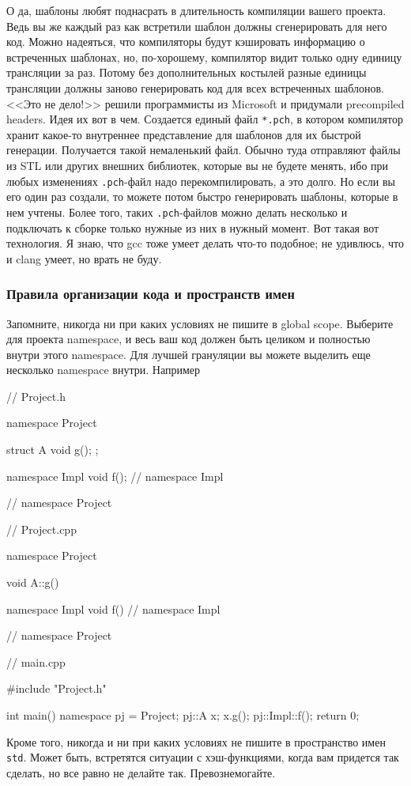 О да, шаблоны любят поднасрать в длительность компиляции вашего проекта.
Ведь вы же каждый раз как встретили шаблон должны сгенерировать для него код.
Можно надеяться, что компиляторы будут кэшировать информацию о встреченных шаблонах, но, по-хорошему, компилятор видит только одну единицу трансляции за раз.
Потому без дополнительных костылей разные единицы трансляции должны заново генерировать код для всех встреченных шаблонов.
<<Это не дело!>> решили программисты из Microsoft и придумали precompiled headers.
Идея их вот в чем.
Создается единый файл \verb"*.pch", в котором компилятор хранит какое-то внутреннее представление для шаблонов для их быстрой генерации.
Получается такой немаленький файл.
Обычно туда отправляют файлы из STL или других внешних библиотек, которые вы не будете менять, ибо при любых изменениях \verb".pch"-файл надо перекомпилировать, а это долго.
Но если вы его один раз создали, то можете потом быстро генерировать шаблоны, которые в нем учтены.
Более того, таких \verb".pch"-файлов можно делать несколько и подключать к сборке только нужные из них в нужный момент.
Вот такая вот технология.
Я знаю, что gcc тоже умеет делать что-то подобное; не удивлюсь, что и clang умеет, но врать не буду.


\subsubsection{Правила организации кода и пространств имен}

Запомните, никогда ни при каких условиях не пишите в global scope.
Выберите для проекта namespace, и весь ваш код должен быть целиком и полностью внутри этого namespace.
Для лучшей грануляции вы можете выделить еще несколько namespace внутри.
Например
\begin{cppcode}
// Project.h

namespace Project {
struct A {
  void g();
};

namespace Impl {
void f();
} // namespace Impl
} // namespace Project

// Project.cpp

namespace Project {
void A::g() {}

namespace Impl {
void f() {}
} // namespace Impl
} // namespace Project

// main.cpp

#include "Project.h"

int main() {
  namespace pj = Project;
  pj::A x;
  x.g();
  pj::Impl::f();
  return 0;
}
\end{cppcode}
Кроме того, никогда и ни при каких условиях не пишите в пространство имен \verb"std".
Может быть, встретятся ситуации с хэш-функциями, когда вам придется так сделать, но все равно не делайте так.
Превознемогайте.

